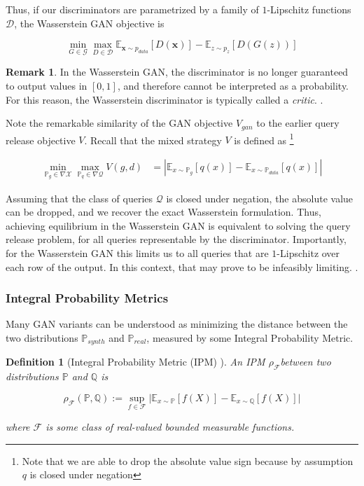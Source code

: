 \documentclass[]{article}
\newcommand{\X}{\mathcal{X}}
\newcommand{\Q}{\mathcal{Q}}
\newcommand{\F}{\mathcal{F}}
\newcommand{\E}{\mathbb{E}}
\newcommand{\p}{\mathbb{P}}
\newtheorem{definition}{Definition}[section]
\theoremstyle{definition}
\newtheorem{remark}{Remark}[section]
\begin{document}
    
    Thus, if our discriminators are parametrized by a family of $1$-Lipschitz functions $\mathcal{D}$, the Wasserstein GAN objective is
    
    \begin{equation}
        \min_{G \in \mathcal{G}} \max_{D \in \mathcal{D}} \mathbb{E}_{\mathbf{x} \sim p_{data}} [D(\mathbf{x})] - \mathbb{E}_{z \sim p_{z}} [D(G(z))]
    \end{equation}

\begin{remark}
    In the Wasserstein GAN, the discriminator is no longer guaranteed to output values in $[0,1]$, and therefore cannot be interpreted as a probability. For this reason, the Wasserstein discriminator is typically called a \emph{critic}. . 
\end{remark}

Note the remarkable similarity of the GAN objective $V_{gan}$ to the earlier query release objective $V$. Recall that the mixed strategy $V$ is defined as \footnote{Note that we are able to drop the absolute value sign because by assumption $q$ is closed under negation}

\begin{align*}
    \min_{\p_g \in \nabla \X} \max_{\p_q \in \nabla\Q }V(g,d) &= |\E_{x \sim \p_g}[q(x)] - \E_{x \sim \p_{data}}[q(x)]|
\end{align*}

Assuming that the class of queries $\Q$ is closed under negation, the absolute value can be dropped, and we recover the exact Wasserstein formulation. Thus, achieving equilibrium in the Wasserstein GAN is equivalent to solving the query release problem, for all queries representable by the discriminator. Importantly, for the Wasserstein GAN this limits us to all queries that are $1$-Lipschitz over each row of the output. In this context, that may prove to be infeasibly limiting. .


\subsubsection{Integral Probability Metrics}

Many GAN variants can be understood as minimizing the distance between the two distributions $\p_{synth}$ and $\p_{real}$, measured by some Integral Probability Metric.

\begin{definition}[Integral Probability Metric (IPM) \cite{Mul97}]
    An IPM $\rho_\F$between two distributions $\mathbb{P}$ and $\mathbb{Q}$ is 

    \begin{equation}
        \rho_\F(\mathbb{P}, \mathbb{Q})  := \sup_{f \in \mathcal{F}} \big| \E_{x \sim \p}[f(X)] - \E_{x \sim \mathbb{Q}}[f(X)] \big|
    \end{equation}

    where $\F$ is some class of real-valued bounded measurable functions.
\end{definition}
\end{document}
